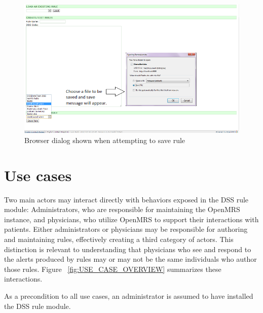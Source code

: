 \documentclass[12pt,letterpaper]{article}
\begin{document}
\begin{figure}\begin{center}
\includegraphics[width=6.5in]{user_guide/save_rule_dialog.png}
\end{center}
\caption{Browser dialog shown when attempting to save rule}
\label{fig:SAVE_RULE_DIALOG}
\end{figure}

\newpage 
\section{Use cases} \label{sec:USE_CASES}

Two main actors may interact directly with behaviors exposed in the 
DSS rule module: Administrators, who are responsible for maintaining 
the OpenMRS instance, and physicians, who utilize OpenMRS to 
support their interactions with patients. Either administrators 
or physicians may be responsible for authoring and maintaining 
rules, effectively creating a third category of actors. This 
distinction is relevant to understanding that physicians who see 
and respond to the alerts produced by rules may or may not be the 
same individuals who author those rules. Figure ~\ref{fig:USE_CASE_OVERVIEW} summarizes these interactions.

As a precondition to all use cases, an administrator is assumed to 
have installed the DSS rule module.
\end{document}
